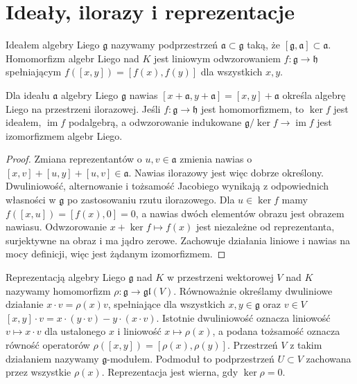 \section{Ideały, ilorazy i reprezentacje}

\begin{definicja}
\label{aa:def:lie-ideal}
Ideałem algebry Liego $\mathfrak g$ nazywamy
podprzestrzeń $\mathfrak a\subset\mathfrak g$ taką,
że $[\mathfrak g,\mathfrak a]\subset\mathfrak a$.
Homomorfizm algebr Liego nad $K$ jest liniowym
odwzorowaniem $f:\mathfrak g\to\mathfrak h$ spełniającym
$f([x,y])=[f(x),f(y)]$ dla wszystkich $x,y$.
\end{definicja}

\begin{twierdzenie}
\label{aa:tw:lie-quotient}
Dla ideału $\mathfrak a$ algebry Liego $\mathfrak g$
nawias $[x+\mathfrak a,y+\mathfrak a]=[x,y]+\mathfrak a$
określa algebrę Liego na przestrzeni ilorazowej.
Jeśli $f:\mathfrak g\to\mathfrak h$ jest homomorfizmem,
to $\ker f$ jest ideałem, $\operatorname{im}f$
podalgebrą, a odwzorowanie indukowane
$\mathfrak g/\ker f\to\operatorname{im}f$ jest
izomorfizmem algebr Liego.
\end{twierdzenie}
\begin{proof}
Zmiana reprezentantów o $u,v\in\mathfrak a$ zmienia
nawias o $[x,v]+[u,y]+[u,v]\in\mathfrak a$.
Nawias ilorazowy jest więc dobrze określony.
Dwuliniowość, alternowanie i tożsamość Jacobiego
wynikają z odpowiednich własności w $\mathfrak g$
po zastosowaniu rzutu ilorazowego.
Dla $u\in\ker f$ mamy $f([x,u])=[f(x),0]=0$,
a nawias dwóch elementów obrazu jest obrazem nawiasu.
Odwzorowanie $x+\ker f\mapsto f(x)$ jest niezależne
od reprezentanta, surjektywne na obraz i ma jądro
zerowe. Zachowuje działania liniowe i nawias
na mocy definicji, więc jest żądanym izomorfizmem.
\end{proof}

\begin{definicja}
\label{aa:def:lie-representation}
Reprezentacją algebry Liego $\mathfrak g$ nad $K$
w przestrzeni wektorowej $V$ nad $K$ nazywamy
homomorfizm $\rho:\mathfrak g\to\mathfrak{gl}(V)$.
Równoważnie określamy dwuliniowe działanie
$x\cdot v=\rho(x)v$, spełniające dla wszystkich
$x,y\in\mathfrak g$ oraz $v\in V$
$[x,y]\cdot v=x\cdot(y\cdot v)-y\cdot(x\cdot v)$.
Istotnie dwuliniowość oznacza liniowość $v\mapsto x\cdot v$
dla ustalonego $x$ i liniowość $x\mapsto\rho(x)$, a podana
tożsamość oznacza równość operatorów
$\rho([x,y])=[\rho(x),\rho(y)]$.
Przestrzeń $V$ z takim działaniem nazywamy
$\mathfrak g$-modułem. Podmoduł to podprzestrzeń
$U\subset V$ zachowana przez wszystkie $\rho(x)$.
Reprezentacja jest wierna, gdy $\ker\rho=0$.
\end{definicja}

